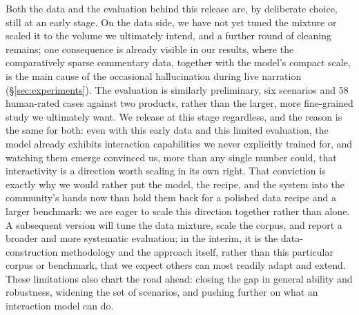 Both the data and the evaluation behind this release are, by deliberate choice, still at an early stage. On the data side, we have not yet tuned the mixture or scaled it to the volume we ultimately intend, and a further round of cleaning remains; one consequence is already visible in our results, where the comparatively sparse commentary data, together with the model's compact scale, is the main cause of the occasional hallucination during live narration (\S\ref{sec:experiments}). The evaluation is similarly preliminary, six scenarios and 58 human-rated cases against two products, rather than the larger, more fine-grained study we ultimately want. We release at this stage regardless, and the reason is the same for both: even with this early data and this limited evaluation, the model already exhibits interaction capabilities we never explicitly trained for, and watching them emerge convinced us, more than any single number could, that interactivity is a direction worth scaling in its own right. That conviction is exactly why we would rather put the model, the recipe, and the system into the community's hands now than hold them back for a polished data recipe and a larger benchmark: we are eager to scale this direction together rather than alone. A subsequent version will tune the data mixture, scale the corpus, and report a broader and more systematic evaluation; in the interim, it is the data-construction methodology and the approach itself, rather than this particular corpus or benchmark, that we expect others can most readily adapt and extend. These limitations also chart the road ahead: closing the gap in general ability and robustness, widening the set of scenarios, and pushing further on what an interaction model can do.


